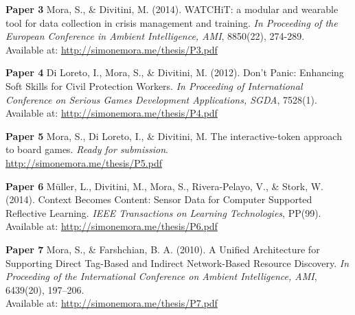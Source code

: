 \documentclass[a4paper,11pt]{article}
\begin{document}
\textbf{Paper 3} Mora, S., \& Divitini, M. (2014). WATCHiT: a modular and wearable tool for data collection in crisis management and training. \emph{In Proceeding of the European Conference in Ambient Intelligence, AMI}, 8850(22), 274-289. \\ Available at: \href{http://simonemora.me/thesis/P3.pdf}{http://simonemora.me/thesis/P3.pdf}
\vspace{0.3cm}

\textbf{Paper 4} Di Loreto, I., Mora, S., \& Divitini, M. (2012). Don't Panic: Enhancing Soft Skills for Civil Protection Workers. \emph{In Proceeding of International Conference on Serious Games Development Applications, SGDA}, 7528(1). \\ Available at: \href{http://simonemora.me/thesis/P4.pdf}{http://simonemora.me/thesis/P4.pdf}
\vspace{0.3cm}

\textbf{Paper 5} Mora, S., Di Loreto, I., \& Divitini, M. The interactive-token approach to board games. \emph{Ready for submission}. \\ \href{http://simonemora.me/thesis/P5.pdf}{http://simonemora.me/thesis/P5.pdf}
\vspace{0.3cm}

\textbf{Paper 6} Müller, L., Divitini, M., Mora, S., Rivera-Pelayo, V., \& Stork, W. (2014). Context Becomes Content: Sensor Data for Computer Supported Reflective Learning. \emph{IEEE Transactions on Learning Technologies}, PP(99). \\ Available at: \href{http://simonemora.me/thesis/P6.pdf}{http://simonemora.me/thesis/P6.pdf}
\vspace{0.3cm}

\textbf{Paper 7} Mora, S., \& Farshchian, B. A. (2010). A Unified Architecture for Supporting Direct Tag-Based and Indirect Network-Based Resource Discovery. \emph{In Proceeding of the International Conference on Ambient Intelligence, AMI}, 6439(20), 197--206. \\ Available at: \href{http://simonemora.me/thesis/P7.pdf}{http://simonemora.me/thesis/P7.pdf}
\end{document}
